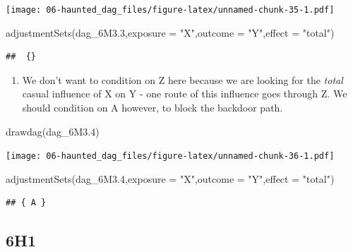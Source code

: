 \documentclass[
]{book}
\newenvironment{Shaded}{\begin{snugshade}}{\end{snugshade}}
\newcommand{\AttributeTok}[1]{\textcolor[rgb]{0.77,0.63,0.00}{#1}}
\newcommand{\FloatTok}[1]{\textcolor[rgb]{0.00,0.00,0.81}{#1}}
\newcommand{\FunctionTok}[1]{\textcolor[rgb]{0.00,0.00,0.00}{#1}}
\newcommand{\NormalTok}[1]{#1}
\newcommand{\StringTok}[1]{\textcolor[rgb]{0.31,0.60,0.02}{#1}}
\providecommand{\tightlist}{%
  \setlength{\itemsep}{0pt}\setlength{\parskip}{0pt}}
\begin{document}
\texttt{[image: 06-haunted\_dag\_files/figure-latex/unnamed-chunk-35-1.pdf]}

\begin{Shaded}
\begin{Highlighting}[]
\FunctionTok{adjustmentSets}\NormalTok{(dag\_6M3}\FloatTok{.3}\NormalTok{,}\AttributeTok{exposure =} \StringTok{"X"}\NormalTok{,}\AttributeTok{outcome =} \StringTok{"Y"}\NormalTok{,}\AttributeTok{effect =} \StringTok{"total"}\NormalTok{)}
\end{Highlighting}
\end{Shaded}

\begin{verbatim}
##  {}
\end{verbatim}

\begin{enumerate}
\def\labelenumi{\arabic{enumi}.}
\setcounter{enumi}{3}
\tightlist
\item
  We don't want to condition on Z here because we are looking for the \emph{total} casual influence of X on Y - one route of this influence goes through Z. We should condition on A however, to block the backdoor path.
\end{enumerate}

\begin{Shaded}
\begin{Highlighting}[]
\FunctionTok{drawdag}\NormalTok{(dag\_6M3}\FloatTok{.4}\NormalTok{)}
\end{Highlighting}
\end{Shaded}

\texttt{[image: 06-haunted\_dag\_files/figure-latex/unnamed-chunk-36-1.pdf]}

\begin{Shaded}
\begin{Highlighting}[]
\FunctionTok{adjustmentSets}\NormalTok{(dag\_6M3}\FloatTok{.4}\NormalTok{,}\AttributeTok{exposure =} \StringTok{"X"}\NormalTok{,}\AttributeTok{outcome =} \StringTok{"Y"}\NormalTok{,}\AttributeTok{effect =} \StringTok{"total"}\NormalTok{)}
\end{Highlighting}
\end{Shaded}

\begin{verbatim}
## { A }
\end{verbatim}

\hypertarget{h1-2}{%
\subsection*{6H1}\label{h1-2}}
\end{document}
